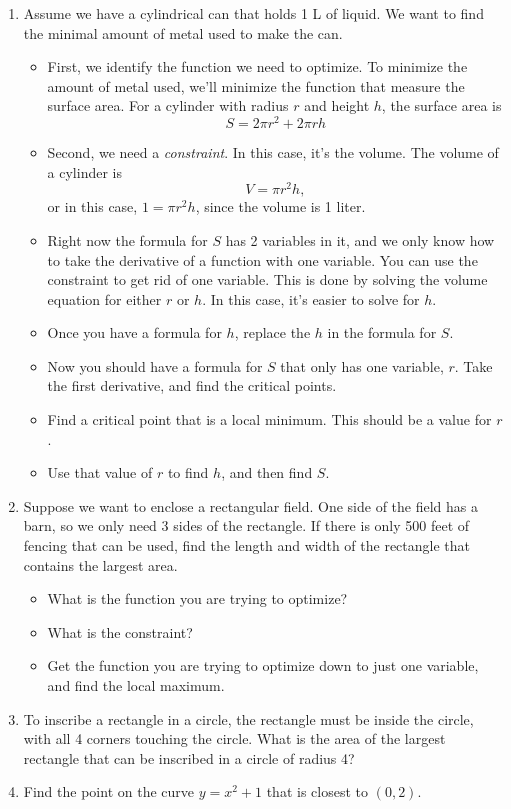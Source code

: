 \documentclass{article}
\begin{document}
\begin{enumerate}
\item Assume we have a cylindrical can that holds 1 L of liquid. We want to find the minimal amount of metal used to make the can.
\begin{itemize}
\item First, we identify the function we need to optimize. To minimize the amount of metal used, we'll minimize the function that measure the surface area. For a cylinder with radius $r$ and height $h$, the surface area is $$S = 2\pi r^2 + 2 \pi r h$$ 
\item Second, we need a \textit{constraint}. In this case, it's the volume. The volume of a cylinder is $$V = \pi r^2 h,$$ or in this case, $1 = \pi r^2h$, since the volume is 1 liter.
\item Right now the formula for $S$ has 2 variables in it, and we only know how to take the derivative of a function with one variable. You can use the constraint to get rid of one variable. This is done by solving the volume equation for either $r$ or $h$. In this case, it's easier to solve for $h$.
\item Once you have a formula for $h$, replace the $h$ in the formula for $S$. 
\item Now you should have a formula for $S$ that only has one variable, $r$. Take the first derivative, and find the critical points.
\item Find a critical point that is a local minimum. This should be a value for $r$.
\item Use that value of $r$ to find $h$, and then find $S$.
\end{itemize}
\item Suppose we want to enclose a rectangular field. One side of the field has a barn, so we only need 3 sides of the rectangle. If there is only 500 feet of fencing that can be used, find the length and width of the rectangle that contains the largest area.
\begin{itemize}
\item What is the function you are trying to optimize?
\item What is the constraint?
\item Get the function you are trying to optimize down to just one variable, and find the local maximum.
\end{itemize}
\item To inscribe a rectangle in a circle, the rectangle must be inside the circle, with all 4 corners touching the circle. What is the area of the largest rectangle that can be inscribed in a circle of radius 4?
\item Find the point on the curve $y = x^2 + 1$ that is closest to $(0,2)$.
\end{enumerate}
\end{document}
